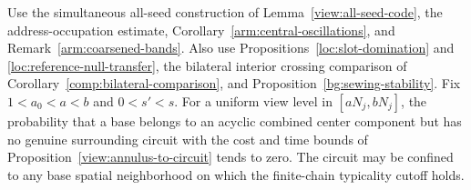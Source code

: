 \begin{proposition}
\label{view:acyclic-circuit}
Use the simultaneous all-seed construction of
Lemma~\ref{view:all-seed-code}, the address-occupation estimate,
Corollary~\ref{arm:central-oscillations}, and
Remark~\ref{arm:coarsened-bands}.
Also use Propositions~\ref{loc:slot-domination} and
\ref{loc:reference-null-transfer}, the bilateral interior crossing
comparison of Corollary~\ref{comp:bilateral-comparison}, and
Proposition~\ref{bg:sewing-stability}.  Fix $1<a_0<a<b$ and $0<s'<s$.
For a uniform view level in $[aN_j,bN_j]$, the probability that a base
belongs to an acyclic combined center component but has no genuine
surrounding circuit with the cost and time bounds of
Proposition~\ref{view:annulus-to-circuit} tends to zero.  The circuit may
be confined to any base spatial neighborhood on which the finite-chain
typicality cutoff holds.
\end{proposition}

